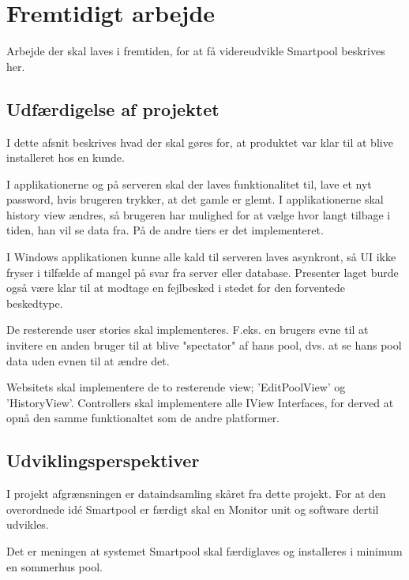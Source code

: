 \chapter{Fremtidigt arbejde}
Arbejde der skal laves i fremtiden, for at få videreudvikle Smartpool beskrives her.
\section{Udfærdigelse af projektet}
I dette afsnit beskrives hvad der skal gøres for, at produktet var klar til at blive installeret hos en kunde.

I applikationerne og på serveren skal der laves funktionalitet til, lave et nyt password, hvis brugeren trykker, at det gamle er glemt.
I applikationerne skal history view ændres, så brugeren har mulighed for at vælge hvor langt tilbage i tiden, han vil se data fra. På de andre tiers er det implementeret.

I Windows applikationen kunne alle kald til serveren laves asynkront, så UI ikke fryser i tilfælde af mangel på svar fra server eller database. Presenter laget burde også være klar til at modtage en fejlbesked i stedet for den forventede beskedtype.

De resterende user stories skal implementeres. F.eks. en brugers evne til at invitere en anden bruger til at blive "spectator" af hans pool, dvs. at se hans pool data uden evnen til at ændre det.

Websitets skal implementere de to resterende view; 'EditPoolView' og 'HistoryView'. Controllers skal implementere alle IView Interfaces, for derved at opnå den samme funktionaltet som de andre platformer.  


\section{Udviklingsperspektiver}
I projekt afgrænsningen er dataindsamling skåret fra dette projekt. For at den overordnede idé Smartpool er færdigt skal en Monitor unit og software dertil udvikles.

Det er meningen at systemet Smartpool skal færdiglaves og installeres i minimum en sommerhus pool.